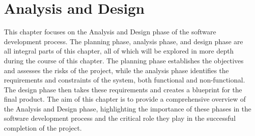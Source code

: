 \chapter{Analysis and Design}

\begin{justify}
    This chapter focuses on the Analysis and Design phase of the software development process. The planning phase, analysis phase, and design phase are all integral parts of this chapter,  all of which will be explored in more depth during the course of this chapter. The planning phase establishes the objectives and assesses the risks of the project, while the analysis phase identifies the requirements and constraints of the system, both functional and non-functional. The design phase then takes these requirements and creates a blueprint for the final product. The aim of this chapter is to provide a comprehensive overview of the Analysis and Design phase, highlighting the importance of these phases in the software development process and the critical role they play in the successful completion of the project.\\
\end{justify}








